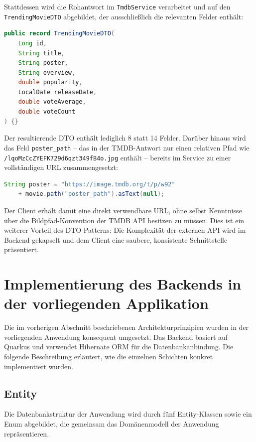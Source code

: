 Stattdessen wird die Rohantwort im \texttt{TmdbService} verarbeitet und auf den
\texttt{TrendingMovieDTO} abgebildet, der ausschließlich die relevanten Felder
enthält:

\begin{lstlisting}[language=java, caption={TrendingMovieDTO als Java Record}]
public record TrendingMovieDTO(
    Long id,
    String title,
    String poster,
    String overview,
    double popularity,
    LocalDate releaseDate,
    double voteAverage,
    double voteCount
) {}
\end{lstlisting}

Der resultierende DTO enthält lediglich 8 statt 14 Felder. Darüber hinaus wird
das Feld \texttt{poster\_path} -- das in der TMDB-Antwort nur einen relativen
Pfad wie \texttt{/lqoMzCcZYEFK729d6qzt349fB4o.jpg} enthält -- bereits im
Service zu einer vollständigen URL zusammengesetzt:

\begin{lstlisting}[language=java, caption={Zusammensetzung der Poster-URL im TmdbService}]
String poster = "https://image.tmdb.org/t/p/w92"
    + movie.path("poster_path").asText(null);
\end{lstlisting}

Der Client erhält damit eine direkt verwendbare URL, ohne selbst Kenntnisse über
die Bildpfad-Konvention der TMDB API besitzen zu müssen. Dies ist ein weiterer
Vorteil des DTO-Patterns: Die Komplexität der externen API wird im Backend
gekapselt und dem Client eine saubere, konsistente Schnittstelle präsentiert.


\section{Implementierung des Backends in der vorliegenden Applikation}

Die im vorherigen Abschnitt beschriebenen Architekturprinzipien wurden in der
vorliegenden Anwendung konsequent umgesetzt. Das Backend basiert auf Quarkus und
verwendet Hibernate ORM für die Datenbankanbindung. Die folgende Beschreibung
erläutert, wie die einzelnen Schichten konkret implementiert wurden.

\subsection{Entity}

Die Datenbankstruktur der Anwendung wird durch fünf Entity-Klassen sowie ein
Enum abgebildet, die gemeinsam das Domänenmodell der Anwendung repräsentieren.

